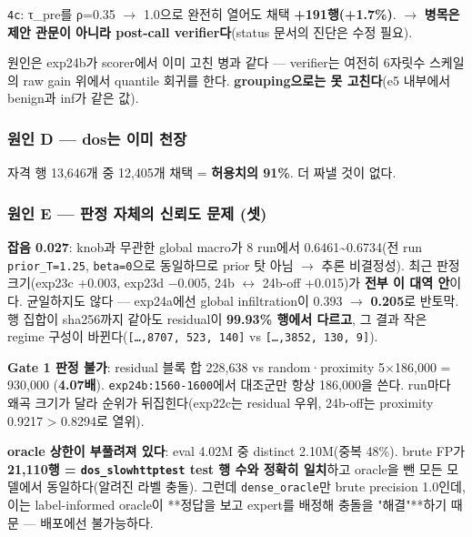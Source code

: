 \par\noindent \textbullet\enspace \texttt{4c}: τ\_\allowbreak{}pre를 ρ=\allowbreak{}0.35  \ensuremath{\rightarrow}  1.0으로 완전히 열어도 채택 \textbf{+\allowbreak{}191행(+\allowbreak{}1.7\%)}.  \ensuremath{\rightarrow}  \textbf{병목은 제안 관문이 아니라 post-call verifier다}(status 문서의 진단은 수정 필요).


원인은 exp24b가 scorer에서 이미 고친 병과 같다 — verifier는 여전히 6자릿수 스케일의 raw gain 위에서 quantile 회귀를 한다. \textbf{grouping으로는 못 고친다}(e5 내부에서 benign과 inf가 같은 값).

\subsubsection{원인 D — dos는 이미 천장}
자격 행 13,646개 중 12,405개 채택 =\allowbreak{} \textbf{허용치의 91\%}. 더 짜낼 것이 없다.

\subsubsection{원인 E — 판정 자체의 신뢰도 문제 (셋)}
\par\noindent \textbullet\enspace \textbf{잡음 0.027}: knob과 무관한 global macro가 8 run에서 0.6461\textasciitilde{}0.6734(전 run \texttt{prior\_\allowbreak{}\allowbreak{}T=\allowbreak{}\allowbreak{}1.\allowbreak{}25}, \texttt{beta=\allowbreak{}\allowbreak{}0}으로 동일하므로 prior 탓 아님  \ensuremath{\rightarrow}  추론 비결정성). 최근 판정 크기(exp23c +\allowbreak{}0.003, exp23d −0.005, 24b \ensuremath{\leftrightarrow} 24b-off +\allowbreak{}0.015)가 \textbf{전부 이 대역 안}이다. 균일하지도 않다 — exp24a에선 global infiltration이 0.393  \ensuremath{\rightarrow}  \textbf{0.205}로 반토막. 행 집합이 sha256까지 같아도 residual이 \textbf{99.93\% 행에서 다르고}, 그 결과 작은 regime 구성이 바뀐다(\texttt{[…,\allowbreak{}8707,\allowbreak{} 523,\allowbreak{} 14\allowbreak{}0]} vs \texttt{[…,\allowbreak{}3852,\allowbreak{} 130,\allowbreak{} 9]\allowbreak{}}).


\par\noindent \textbullet\enspace \textbf{Gate 1 판정 불가}: residual 블록 합 228,638 vs random·proximity 5×186,000 =\allowbreak{} 930,000 (\textbf{4.07배}). \texttt{exp24b:1\allowbreak{}560-\allowbreak{}1600\allowbreak{}}에서 대조군만 항상 186,000을 쓴다. run마다 왜곡 크기가 달라 순위가 뒤집힌다(exp22c는 residual 우위, 24b-off는 proximity 0.9217 > 0.8294로 열위).


\par\noindent \textbullet\enspace \textbf{oracle 상한이 부풀려져 있다}: eval 4.02M 중 distinct 2.10M(중복 48\%). brute FP가 \textbf{21,110행 =\allowbreak{} \texttt{dos\_\allowbreak{}\allowbreak{}slow\allowbreak{}httptest\allowbreak{}} test 행 수와 정확히 일치}하고 oracle을 뺀 모든 모델에서 동일하다(알려진 라벨 충돌). 그런데 \texttt{dense\_\allowbreak{}\allowbreak{}or\allowbreak{}acle}만 brute precision 1.0인데, 이는 label-informed oracle이 **정답을 보고 expert를 배정해 충돌을 "해결"**하기 때문 — 배포에선 불가능하다.


